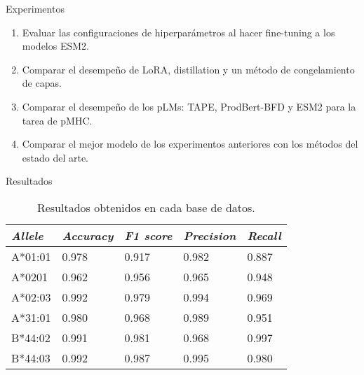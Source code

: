 \documentclass[10pt]{beamer}
\newcommand{\1}{
	\setbeamertemplate{background}{
		\texttt{[image: ../img/1]}
		\tikz[overlay] \fill[fill opacity=0.75,fill=white] (0,0) rectangle (-\paperwidth,\paperheight);
	}
}
\begin{document}
\begin{frame}{Experimentos}{}
	\begin{enumerate}
		\item Evaluar las configuraciones de hiperparámetros al hacer fine-tuning a los modelos ESM2.
		\item Comparar el desempeño de LoRA, distillation y un método de congelamiento de capas.
		\item Comparar el desempeño de los pLMs: TAPE, ProdBert-BFD y ESM2 para la tarea de pMHC.
		\item Comparar el mejor modelo de los experimentos anteriores con los métodos del estado del arte.
	\end{enumerate}
\end{frame}
	
	\begin{frame}{Resultados}{}
		\begin{table}[]
			\centering
			\caption{Resultados obtenidos en cada base de datos. }
			\label{tab:results}
			\setlength{\tabcolsep}{0.8em} %
			{\renewcommand{\arraystretch}{1.3}%
				\begin{tabular}{lllll}
					\hline
					\textit{\textbf{Allele}} & \textit{\textbf{Accuracy}} & \textit{\textbf{F1 score}} & \textit{\textbf{Precision}} & \textit{\textbf{Recall}} \\
					\hline
					A*01:01                  & 0.978                      & 0.917                      & 0.982                       & 0.887                    \\
					A*0201                   & 0.962                      & 0.956                      & 0.965                       & 0.948                    \\
					A*02:03                  & 0.992                      & 0.979                      & 0.994                       & 0.969                    \\
					A*31:01                  & 0.980                      & 0.968                      & 0.989                       & 0.951                    \\
					B*44:02                  & 0.991                      & 0.981                      & 0.968                       & 0.997                    \\
					B*44:03                  & 0.992                      & 0.987                      & 0.995                       & 0.980                   
				\end{tabular}
			}
		\end{table}
	\end{frame}
	
\end{document}
